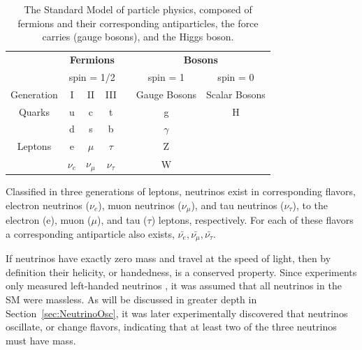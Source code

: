 
\begin{table}
	\centering
\begin{tabular}{|c|c|c|c|c|c|c|}
	\hline 
	& \multicolumn{3}{c|}{\textbf{Fermions}} & & \multicolumn{2}{c|}{\textbf{Bosons}}  \\ 
	& \multicolumn{3}{c|}{spin = 1/2} & & spin = 1 & spin = 0 \\
	\hline 
	Generation & I & II & III & & Gauge Bosons & Scalar Bosons \\ 
	\hline 
	Quarks & u & c & t & & g & H \\ 
	& d & s & b & & $\gamma$ &  \\ 
	Leptons & e & $\mu$ & $\tau$ & &  Z &  \\ 
	& $\nu_{e}$ & $\nu_{\mu}$ & $\nu_{\tau}$ & & W &  \\ 
	\hline 
\end{tabular}
\caption[The Standed Model of Particle Physics]{The Standard Model of particle physics, composed of fermions and their corresponding antiparticles, the force carries (gauge bosons), and the Higgs boson.}
\label{tab:SM}
\end{table}

Classified in three generations of leptons, neutrinos exist in corresponding flavors, electron neutrinos ($\nu_{e}$), muon neutrinos ($\nu_{\mu}$), and tau neutrinos ($\nu_{\tau}$), to the electron (e), muon ($\mu$), and tau ($\tau$) leptons, respectively.
For each of these flavors a corresponding antiparticle also exists, $\bar{\nu_e}, \bar{\nu_\mu}, \bar{\nu_\tau}$.

If neutrinos have exactly zero mass and travel at the speed of light, then by definition their helicity, or handedness, is a conserved property. 
Since experiments only measured left-handed neutrinos \cite{PhysRev.109.1015}, it was assumed that all neutrinos in the SM were massless.
As will be discussed in greater depth in Section~\ref{sec:NeutrinoOsc}, it was later experimentally discovered that neutrinos oscillate, or change flavors, indicating that at least two of the three neutrinos must have mass.

